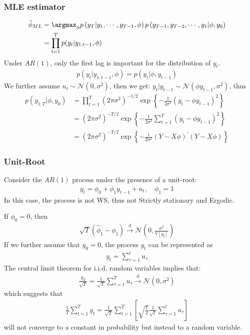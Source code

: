 \subsubsection{MLE estimator}
\begin{align*}
    \hat{\phi}_{ML} &= \argmax_{\phi} p\left( y_T | y_1, \cdots, y_{T-1}, \phi \right) p\left( y_{T-1}, y_{T-2}, \cdots, y_1 | \phi, y_0 \right) \\
    &= \prod_{t=1}^{T} p(y_t | y_{1:t-1}, \phi)
\end{align*}
Under $AR(1)$, only the first lag is important for the distribution of $y_t$.
\begin{gather*}
    p(y_t | y_{1:t-1}, \phi) = p(y_t | \phi, y_{t-1})
\end{gather*}
We further assume $u_t \sim \mathcal{N} (0, \sigma^2)$, then we get: $y_t | y_{t-1} \sim \mathcal{N} (\phi y_{t-1}, \sigma^2)$, thus
\begin{align*}
    p(y_{1:T} | \phi, y_0) &= \prod_{t=1}^{T}(2 \pi \sigma^2)^{-1/2} \exp\left\{-\frac{1}{2 \sigma^2} (y_t - \phi y_{t-1})^2\right\} \\
    &= (2 \pi \sigma^2)^{-T/2} \exp\left\{-\frac{1}{2 \sigma^2} \sum_{t=1}^{T} (y_t - \phi y_{t-1})^2\right\} \\
    &= (2 \pi \sigma^2)^{-T/2} \exp\left\{-\frac{1}{2 \sigma^2} (Y - X \phi)^{\prime} (Y - X \phi) \right\}
\end{align*}

\subsubsection{Unit-Root}

Consider the $AR(1)$ process under the presence of a unit-root:
\begin{gather*}
    y_t = \phi_0 + \phi_1 y_{t-1} + u_t, \quad \phi_1 = 1
\end{gather*}
In this case, the process is not WS, thus not Strictly stationary and Ergodic.

If $\phi_0 = 0$, then 
\begin{gather*}
    \sqrt{T}(\hat{\phi}_1 - \phi_1) \overset{d}{\rightarrow} \mathcal{N}\left(0, \frac{\sigma^2}{\mathbb{V}[y_t]}\right) 
\end{gather*}
If we further assume that $y_0=0$, the process $y_t$ can be represented as 
\begin{gather*}
    y_t = \sum_{\tau=1}^{t} u_{\tau}
\end{gather*}
The central limit theorem for i.i.d. random variables implies that:
\begin{gather*}
    \frac{y_T}{\sqrt{T}} = \frac{1}{\sqrt{T}} \sum_{\tau=1}^{T} u_{\tau} \overset{d}{\rightarrow} \mathcal{N}(0, \sigma^2)
\end{gather*}
which suggests that 
\begin{gather*}
    \frac{1}{T} \sum_{t=1}^{T} y_t = \frac{1}{\sqrt{T}} \sum_{t=1}^{T}\left[ \sqrt{\frac{t}{T}} \frac{1}{\sqrt{t}} \sum_{\tau =1}^{t} u_{\tau} \right]
\end{gather*}
will not converge to a constant in probability but instead to a random variable.

